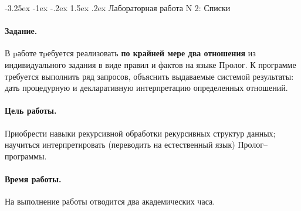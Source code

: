 \documentclass[12pt, openany, twoside]{book} %
\makeatletter
\renewcommand\section{\@startsection {section}{1}{\z@}%
                                   {-3.25ex \@plus -1ex \@minus -.2ex}%
                                   {1.5ex \@plus.2ex}%
                                   {\normalfont\large\bfseries}}
\makeatother
\begin{document}
\section{Лабораторная работа N 2: Списки}

\paragraph{Задание.} В pаботе тpебуется реализовать {\bf по крайней мере два отношения} из индивидуального задания в виде правил и фактов на языке Пpолог. К программе требуется выполнить ряд запросов, объяснить выдаваемые системой результаты: дать процедурную и декларативную интерпретацию определенных отношений.

\paragraph{Цель работы.} Приобрести навыки рекурсивной обработки рекурсивных структур данных; научиться интерпретировать (переводить на естественный язык) Пролог--программы.

\paragraph{Время работы.} На выполнение работы отводится два академических часа.
\end{document}
